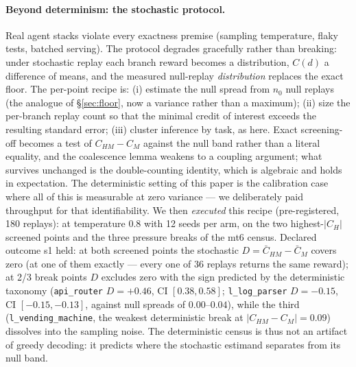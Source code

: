 \documentclass{article}
\theoremstyle{remark}
\begin{document}
\paragraph{Beyond determinism: the stochastic protocol.} Real agent stacks
violate every exactness premise (sampling temperature, flaky tests, batched
serving). The protocol degrades gracefully rather than breaking: under
stochastic replay each branch reward becomes a distribution, $C(d)$ a
difference of means, and the measured null-replay \emph{distribution}
replaces the exact floor. The per-point recipe is: (i) estimate the null
spread from $n_0$ null replays (the analogue of \S\ref{sec:floor}, now a
variance rather than a maximum); (ii) size the per-branch replay count so
that the minimal credit of interest exceeds the resulting standard error;
(iii) cluster inference by task, as here. Exact screening-off becomes a
test of $C_{HM} - C_M$ against the null band rather than a literal
equality, and the coalescence lemma weakens to a coupling argument; what
survives unchanged is the double-counting identity, which is algebraic and
holds in expectation. The deterministic setting of this paper is the
calibration case where all of this is measurable at zero variance --- we
deliberately paid throughput for that identifiability.
We then \emph{executed} this recipe (pre-registered, 180 replays): at
temperature $0.8$ with 12 seeds per arm, on the two highest-$|C_H|$
screened points and the three pressure breaks of the mt6 census. Declared
outcome s1 held: at both screened points the stochastic
$D = \bar{C}_{HM} - \bar{C}_M$ covers zero (at one of them exactly ---
every one of 36 replays returns the same reward); at 2/3 break points $D$
excludes zero with the sign predicted by the deterministic taxonomy
(\texttt{api\_router} $D = +0.46$, CI $[0.38, 0.58]$; \texttt{l\_log\_parser}
$D = -0.15$, CI $[-0.15, -0.13]$, against null spreads of $0.00$--$0.04$),
while the third (\texttt{l\_vending\_machine}, the weakest deterministic
break at $|C_{HM}-C_M| = 0.09$) dissolves into the sampling noise. The
deterministic census is thus not an artifact of greedy decoding: it
predicts where the stochastic estimand separates from its null band.
\end{document}
